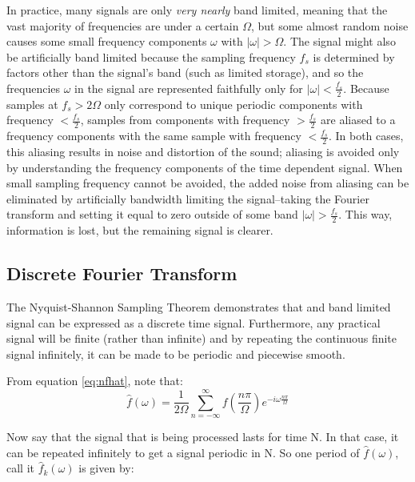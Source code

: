 \documentclass[12pt]{article}
\begin{document}
In practice, many signals are only \emph{very nearly} band limited, meaning that the vast majority of frequencies are under a certain \( \Omega \), but some almost random noise causes some small frequency components \( \omega \) with \( |\omega| > \Omega \). The signal might also be artificially band limited because the sampling frequency \( f_s\) is determined by factors other than the signal's band (such as limited storage), and so the frequencies \( \omega \) in the signal are represented faithfully only for \(|\omega| < \frac{f_s}{2} \). Because samples at \( f_s > 2\Omega \) only correspond to unique periodic components with frequency \( < \frac{f_s}{2} \), samples from components with frequency \( > \frac{f_s}{2} \) are aliased to a frequency components with the same sample with frequency \( < \frac{f_s}{2} \). In both cases, this aliasing results in noise and distortion of the sound; aliasing is avoided only by understanding the frequency components of the time dependent signal. When small sampling frequency cannot be avoided, the added noise from aliasing can be eliminated by artificially bandwidth limiting the signal--taking the Fourier transform and setting it equal to zero outside of some band \( |\omega| > \frac{f_s}{2}  \). This way, information is lost, but the remaining signal is clearer. 


\subsection{Discrete Fourier Transform}

The Nyquist-Shannon Sampling Theorem demonstrates that and band limited signal can be expressed as a discrete time signal. Furthermore, any practical signal will be finite (rather than infinite) and by repeating the continuous finite signal infinitely, it can be made to be periodic and piecewise smooth.

From equation \eqref{eq:nfhat}, note that:
\[\hat{f}(\omega)  = \frac{1}{2\Omega} \sum_{n = -\infty}^{\infty} f(\frac{n\pi}{\Omega})e^{-i \omega \frac{n \pi}{\Omega} } \]

Now say that the signal that is being processed lasts for time N. In that case, it can be repeated infinitely to get a signal periodic in N. So one period of \(\hat{f}(\omega) \), call it \(\hat{f}_{k}(\omega) \) is given by:
\end{document}
